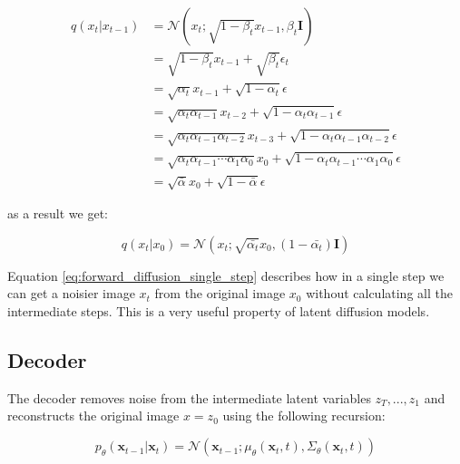 \begin{align*}
    q(x_t | x_{t-1}) &= \mathcal{N} \left( x_t; \sqrt{1-\beta_t} x_{t-1}, \beta_t \mathbf{I} \right) \\
    &= \sqrt{1-\beta_t} x_{t-1} + \sqrt{\beta_t} \epsilon_t \\
    &= \sqrt{\alpha_t} x_{t-1} + \sqrt{1 - \alpha_t} \epsilon \\
    &= \sqrt{\alpha_t \alpha_{t-1}} x_{t-2} + \sqrt{1 - \alpha_t \alpha_{t-1}} \epsilon \\
    &= \sqrt{\alpha_t \alpha_{t-1} \alpha_{t-2}} x_{t-3} + \sqrt{1 - \alpha_t \alpha_{t-1} \alpha_{t-2}} \epsilon \\
    &= \sqrt{\alpha_t \alpha_{t-1} \cdots \alpha_1 \alpha_0} x_0 + \sqrt{1 - \alpha_t \alpha_{t-1} \cdots \alpha_1 \alpha_0} \epsilon \\
    &= \boxed{ \sqrt{\bar{\alpha}} x_0 + \sqrt{1 - \bar{\alpha}} \epsilon }
\end{align*}

as a result we get:

\begin{equation}
    q(x_t | x_0) = \mathcal{N} (x_t; \sqrt{\bar{\alpha_t}} x_0, (1-\bar{\alpha_t}) \mathbf{I})
    \label{eq:forward_diffusion_single_step}
\end{equation}

Equation \ref{eq:forward_diffusion_single_step} describes how in a single step we can get a noisier image $x_t$ from the original image $x_0$ without calculating all the intermediate steps. This is a very useful property of latent diffusion models.









\subsection{Decoder}

The decoder removes noise from the intermediate latent variables $z_T, ..., z_1$ and reconstructs the original image $x = z_0$ using the following recursion:

\begin{equation}
    p_\theta(\mathbf{x}_{t-1} | \mathbf{x}_t) = \mathcal{N}(\mathbf{x}_{t-1}; \mu_\theta(\mathbf{x}_t, t), \Sigma_\theta(\mathbf{x}_t, t))
    \label{eq:reverse_diffusion}
\end{equation}

